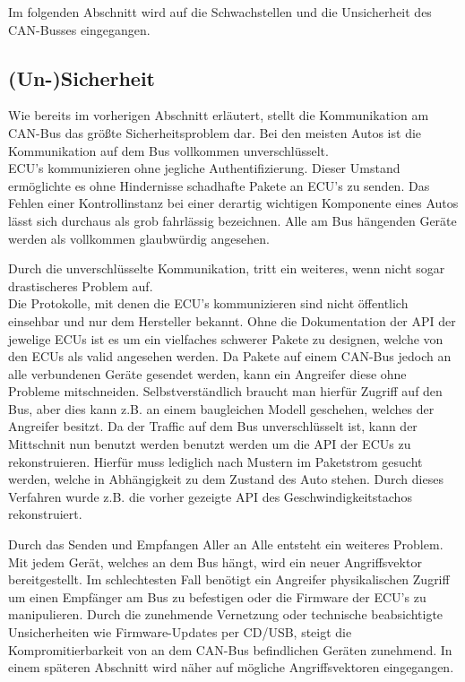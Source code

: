\documentclass[
    fontsize=12pt,
    headings=small,
    parskip=half,           %
    bibliography=totoc,9
    numbers=noenddot,       %
    open=any,               %
    ]{scrreprt}
\begin{document}
Im folgenden Abschnitt wird auf die Schwachstellen und die Unsicherheit des CAN-Busses eingegangen.

\subsection{(Un-)Sicherheit}
Wie bereits im vorherigen Abschnitt erläutert, stellt die Kommunikation am CAN-Bus das größte Sicherheitsproblem dar.
Bei den meisten Autos ist die Kommunikation auf dem Bus vollkommen unverschlüsselt. \\
ECU's kommunizieren ohne jegliche Authentifizierung. Dieser Umstand ermöglichte es ohne Hindernisse schadhafte Pakete an ECU's zu senden.
Das Fehlen einer Kontrollinstanz bei einer derartig wichtigen Komponente eines Autos lässt sich durchaus als grob fahrlässig bezeichnen.
Alle am Bus hängenden Geräte werden als vollkommen glaubwürdig angesehen.

Durch die unverschlüsselte Kommunikation, tritt ein weiteres, wenn nicht sogar drastischeres Problem auf. \\
Die Protokolle, mit denen die ECU's kommunizieren sind nicht öffentlich einsehbar und nur dem Hersteller bekannt.
Ohne die Dokumentation der API der jewelige ECUs ist es um ein vielfaches schwerer Pakete zu designen, welche von den ECUs als valid angesehen werden.
Da Pakete auf einem CAN-Bus jedoch an alle verbundenen Geräte gesendet werden, kann ein Angreifer diese ohne Probleme mitschneiden.
Selbstverständlich braucht man hierfür Zugriff auf den Bus, aber dies kann z.B. an einem baugleichen Modell geschehen, welches der Angreifer besitzt.
Da der Traffic auf dem Bus unverschlüsselt ist, kann der Mittschnit nun benutzt werden benutzt werden um die API der ECUs zu rekonstruieren.
Hierfür muss lediglich nach Mustern im Paketstrom gesucht werden, welche in Abhängigkeit zu dem Zustand des Auto stehen.
Durch dieses Verfahren wurde z.B. die vorher gezeigte API des Geschwindigkeitstachos rekonstruiert.

Durch das Senden und Empfangen Aller an Alle entsteht ein weiteres Problem. Mit jedem Gerät, welches an dem Bus hängt, wird ein neuer Angriffsvektor bereitgestellt.
Im schlechtesten Fall benötigt ein Angreifer physikalischen Zugriff um einen Empfänger am Bus zu befestigen oder die Firmware der ECU's zu manipulieren.
Durch die zunehmende Vernetzung oder technische beabsichtigte Unsicherheiten wie Firmware-Updates per CD/USB, steigt die Kompromitierbarkeit von an dem CAN-Bus befindlichen Geräten zunehmend.
In einem späteren Abschnitt wird näher auf mögliche Angriffsvektoren eingegangen.
\end{document}
